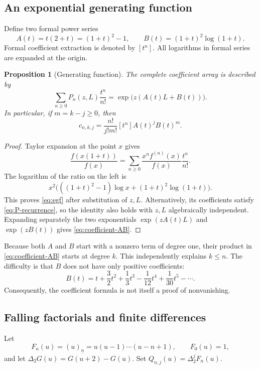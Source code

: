 \documentclass[11pt]{article}
\numberwithin{equation}{section}
\newtheorem{proposition}[theorem]{Proposition}
\theoremstyle{definition}
\theoremstyle{remark}
\newcommand{\fall}[2]{(#1)_{\underline{#2}}}
\begin{document}
\subsection{An exponential generating function}
Define two formal power series
\begin{equation}\label{eq:AB}
 A(t)=t(2+t)=(1+t)^2-1,\qquad
 B(t)=(1+t)^2\log(1+t).
\end{equation}
Formal coefficient extraction is denoted by $[t^n]$. All logarithms in
formal series are expanded at the origin.

\begin{proposition}[Generating function]\label{prop:egf}
The complete coefficient array is described by
\begin{equation}\label{eq:egf}
 \sum_{n\ge0}P_n(z,L)\frac{t^n}{n!}
   =\exp\bigl(z(A(t)L+B(t))\bigr).
\end{equation}
In particular, if $m=k-j\ge0$, then
\begin{equation}\label{eq:coefficient-AB}
 \boxed{\quad
 c_{n,k,j}=\frac{n!}{j!m!}[t^n]A(t)^j B(t)^m.
 \quad}
\end{equation}
\end{proposition}
\begin{proof}
Taylor expansion at the point $x$ gives
\[
 \frac{f(x(1+t))}{f(x)}
 =\sum_{n\ge0}\frac{x^nf^{(n)}(x)}{f(x)}\frac{t^n}{n!}.
\]
The logarithm of the ratio on the left is
\[
 x^2\bigl(((1+t)^2-1)\log x+(1+t)^2\log(1+t)\bigr).
\]
This proves \eqref{eq:egf} after substitution of $z,L$. Alternatively,
its coefficients satisfy \eqref{eq:P-recurrence}, so the identity also
holds with $z,L$ algebraically independent. Expanding separately the two
exponentials $\exp(zA(t)L)$ and $\exp(zB(t))$ gives
\eqref{eq:coefficient-AB}.
\end{proof}

Because both $A$ and $B$ start with a nonzero term of degree one, their
product in \eqref{eq:coefficient-AB} starts at degree $k$. This independently
explains $k\le n$. The difficulty is that $B$ does not have only positive
coefficients:
\[
 B(t)=t+\frac32t^2+\frac13t^3-\frac1{12}t^4+\frac1{30}t^5-\cdots.
\]
Consequently, the coefficient formula is not itself a proof of
nonvanishing.

\subsection{Falling factorials and finite differences}
Let
\[
 F_n(u)=\fall{u}{n}=u(u-1)\cdots(u-n+1),\qquad F_0(u)=1,
\]
and let $\Delta_2G(u)=G(u+2)-G(u)$. Set
$Q_{n,j}(u)=\Delta_2^jF_n(u)$.
\end{document}
